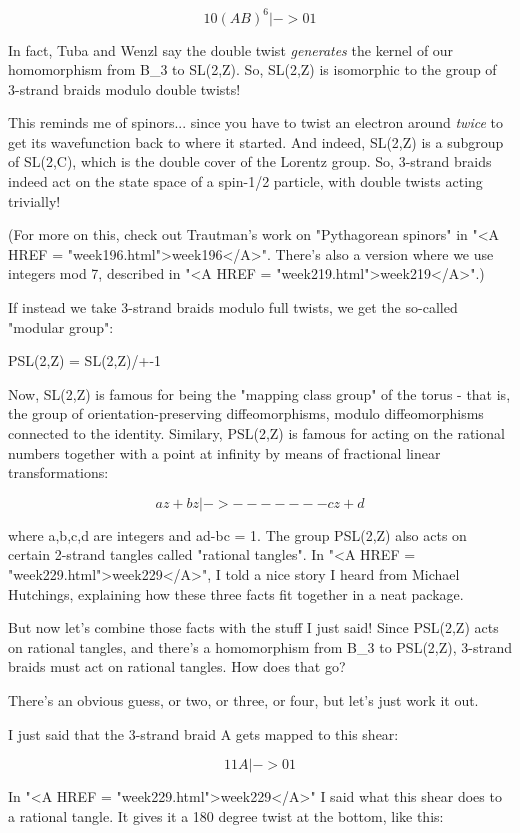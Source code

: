 $$
             1   0 
(AB)^{6} |->  
             0   1
$$
    
In fact, Tuba and Wenzl say the double twist \emph{generates} the
kernel of our homomorphism from B_{3} to SL(2,Z).  So, SL(2,Z)
is isomorphic to the group of 3-strand braids modulo double twists!

This reminds me of spinors... since you have to twist an electron 
around \emph{twice} to get its wavefunction back to where it started.   
And indeed, SL(2,Z) is a subgroup of SL(2,C), which is the double 
cover of the Lorentz group.  So, 3-strand braids indeed act on the 
state space of a spin-1/2 particle, with double twists acting 
trivially!

(For more on this, check out Trautman's work on "Pythagorean
spinors" in "<A HREF = "week196.html">week196</A>".
There's also a version where we use integers mod 7, described in
"<A HREF = "week219.html">week219</A>".)

If instead we take 3-strand braids modulo full twists, we get the 
so-called "modular group":

PSL(2,Z) = SL(2,Z)/{+-1}

Now, SL(2,Z) is famous for being the "mapping class group"
of the torus - that is, the group of orientation-preserving
diffeomorphisms, modulo diffeomorphisms connected to the identity.
Similary, PSL(2,Z) is famous for acting on the rational numbers
together with a point at infinity by means of fractional linear
transformations:

$$
         az + b
z |->   -------
         cz + d
$$
    

where a,b,c,d are integers and ad-bc = 1.  The group PSL(2,Z) also
acts on certain 2-strand tangles called "rational tangles".
In "<A HREF = "week229.html">week229</A>", I told a nice
story I heard from Michael Hutchings, explaining how these three facts
fit together in a neat package.
 

But now let's combine those facts with the stuff I just said!  Since
PSL(2,Z) acts on rational tangles, and there's a homomorphism from
B_{3} to PSL(2,Z), 3-strand braids must act on rational
tangles.  How does that go?

There's an obvious guess, or two, or three, or four, but let's just
work it out.

I just said that the 3-strand braid A gets mapped to this shear:

$$
        1   1
A |->  
        0   1
$$
    
In "<A HREF = "week229.html">week229</A>" I said what this
shear does to a rational tangle.  It gives it a 180 degree twist at
the bottom, like this:

